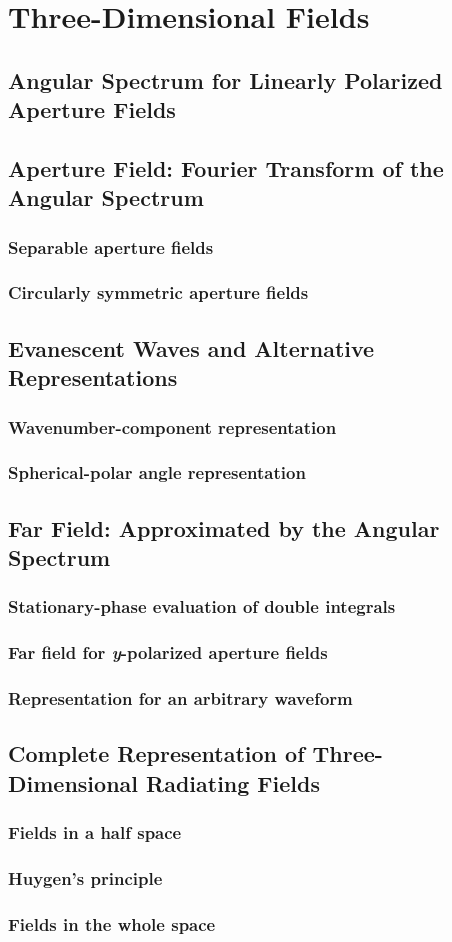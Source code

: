 \chapter{Three-Dimensional Fields}
\label{ch:3dfield}

\section{Angular Spectrum for Linearly Polarized Aperture Fields}

\section{Aperture Field: Fourier Transform of the Angular Spectrum}
\subsection{Separable aperture fields}
\subsection{Circularly symmetric aperture fields}

\section{Evanescent Waves and Alternative Representations}
\subsection{Wavenumber-component representation}
\subsection{Spherical-polar angle representation}

\section{Far Field: Approximated by the Angular Spectrum}
\subsection{Stationary-phase evaluation of double integrals}
\subsection{Far field for \textit{y}-polarized aperture fields}
\subsection{Representation for an arbitrary waveform}

\section{Complete Representation of Three-Dimensional Radiating Fields}
\subsection{Fields in a half space}
\subsection{Huygen's principle}
\subsection{Fields in the whole space}